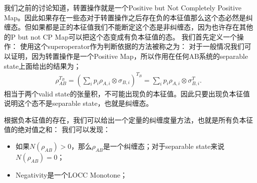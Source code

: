 我们之前的讨论知道，转置操作就是一个Positive but Not Completely Positive
Map。因此如果存在一些态对于转置操作之后存在负的本征值那么这个态必然是纠缠态。但如果都是正的本征值我们不能断定这个态是非纠缠态，因为也许存在其他的P
but not CP Map可以把这个态变成有负本征值的态。 我们首先定义一个操作：
使用这个superoperator作为判断依据的方法被称之为：
对于一般情况我们可以证明，因为转置操作是一个Positive Map，所以作用在任何AB系统的separable state上面给出的结果为；
\begin{align}
  \rho_{AB}^{T_B}=\left(\sum_ip_i\rho_{A,i}\otimes\sigma_{B,i}\right)^{T_B}=\sum_ip_i\rho_{A,i}\otimes\sigma_{B,i}^T.
\end{align}
相当于两个valid state的张量积，不可能出现负的本征值。因此只要出现负本征值说明这个态不是separable state，也就是纠缠态。

\bigskip
{}

根据负本征值的存在，我们可以给出一个定量的纠缠度量方法，也就是所有负本征值的绝对值之和：
我们可以发现：
\begin{itemize}
  \item 如果$ N(\rho_{AB}) > 0 $，那么$ \rho_{AB} $是一个纠缠态；对于separable
    state来说$ N(\rho_{AB}) = 0 $；
  \item Negativity是一个LOCC Monotone；
\end{itemize}
